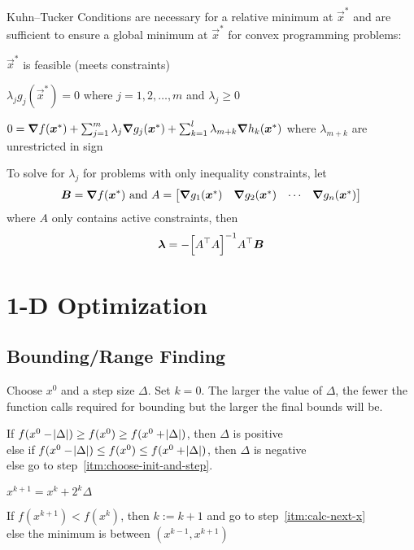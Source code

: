 \documentclass{article}
\begin{document}
Kuhn--Tucker Conditions are necessary for a relative minimum at \(\vec{x}^*\) and are sufficient to
ensure a global minimum at \(\vec{x}^*\) for convex programming problems:
\begin{enumerate*}
  \item \(\vec{x}^*\) is feasible (meets constraints)
  \item \(\lambda_j g_j(\vec{x}^*) = 0\) where \(j = 1, 2, \dots, m\) and \(\lambda_j \ge 0\)
  \item \(0 = \bm{\nabla} f(\bm{x}^*) + \sum_{j=1}^m{\lambda_j \bm{\nabla} g_j(\bm{x}^*)} +
    \sum_{k=1}^l{\lambda_{m+k} \bm{\nabla} h_k(\bm{x}^*)}\)
    where \(\lambda_{m+k}\) are unrestricted in sign
\end{enumerate*}
To solve for \(\lambda_j\) for problems with only inequality constraints, let
\[\bm{B} = \bm{\nabla} f(\bm{x}^*) \textrm{ and } A =
\begin{bmatrix}
  \bm{\nabla} g_1(\bm{x}^*) & \bm{\nabla} g_2(\bm{x}^*) & \cdots & \bm{\nabla} g_n(\bm{x}^*)
\end{bmatrix}\]
where \(A\) only contains active constraints, then
\[\bm{\lambda} = -{\left[{{A}^\top} A\right]}^{-1} {{A}^\top} \bm{B}\]

\section{1-D Optimization}\label{sec:1-d-optimization}

\subsection{Bounding\slash{}Range Finding}\label{sec:bounding}

\begin{enumerate*}
\item \label{itm:choose-init-and-step} Choose \(x^0\) and a step size \(\Delta\). Set \(k = 0\). The
  larger the value of \(\Delta\), the fewer the function calls required for bounding but the larger
  the final bounds will be.
\item If \(f(x^0 - \abs{\Delta}) \ge f(x^0) \ge f(x^0 + \abs{\Delta})\),
  then \(\Delta\) is positive \\
  else if \(f(x^0 - \abs{\Delta}) \le f(x^0) \le f(x^0 + \abs{\Delta})\),
  then \(\Delta\) is negative \\
  else go to step~\ref{itm:choose-init-and-step}.
\item \label{itm:calc-next-x} \(x^{k+1} = x^k + 2^k \Delta\)
\item If \(f(x^{k+1}) < f(x^k)\),
  then \(k := k + 1\) and go to step~\ref{itm:calc-next-x} \\
  else the minimum is between \((x^{k-1}, x^{k+1})\)
\end{enumerate*}
\end{document}
